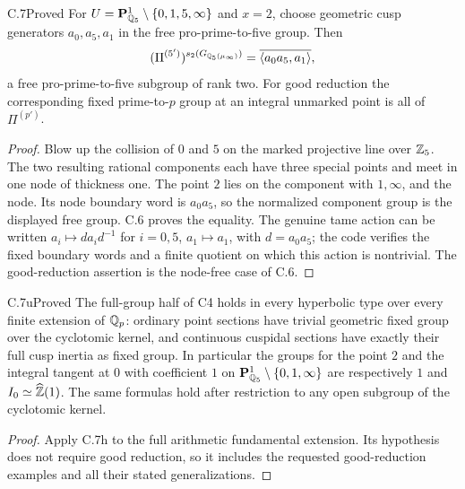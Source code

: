 \begin{claim}{C.7}{Proved}
For $U=\mathbf P^1_{\mathbb Q_5}\setminus\{0,1,5,\infty\}$ and $x=2$, choose
geometric cusp generators $a_0,a_5,a_1$ in the free pro-prime-to-five group.
Then
\[
 (\Pi^{(5')})^{s_2(G_{\mathbb Q_5(\mu_\infty)})}
 =\overline{\langle a_0a_5,a_1\rangle},
\]
a free pro-prime-to-five subgroup of rank two. For good reduction the
corresponding fixed prime-to-$p$ group at an integral unmarked point is
all of $\Pi^{(p')}$.
\end{claim}
\begin{proof}
Blow up the collision of $0$ and $5$ on the marked projective line over
$\mathbb Z_5$. The two resulting rational components each have three special
points and meet in one node of thickness one. The point $2$ lies on the
component with $1,\infty$, and the node. Its node boundary word is
$a_0a_5$, so the normalized component group is the displayed free group.
C.6 proves the equality. The genuine tame action can be written
$a_i\mapsto d a_i d^{-1}$ for $i=0,5$, $a_1\mapsto a_1$, with
$d=a_0a_5$; the code verifies the fixed boundary words and a finite quotient
on which this action is nontrivial. The good-reduction assertion is the
node-free case of C.6.
\end{proof}










\begin{claim}{C.7u}{Proved}
The full-group half of C4 holds in every hyperbolic type over every
finite extension of $\mathbb Q_p$: ordinary point sections have trivial
geometric fixed group over the cyclotomic kernel, and continuous
cuspidal sections have exactly their full cusp inertia as fixed group.
In particular the groups for the point $2$ and the integral tangent at
$0$ with coefficient $1$ on
$\mathbf P^1_{\mathbb Q_5}\setminus\{0,1,\infty\}$ are respectively $1$
and $I_0\simeq\widehat{\mathbb Z}(1)$. The same formulas hold after restriction
to any open subgroup of the cyclotomic kernel.
\end{claim}
\begin{proof}
Apply C.7h to the full arithmetic fundamental extension. Its hypothesis
does not require good reduction, so it includes the requested
good-reduction examples and all their stated generalizations.
\end{proof}

